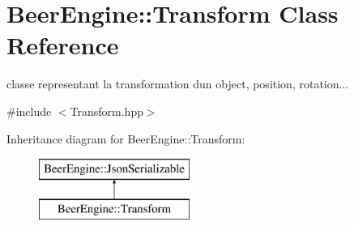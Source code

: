 \hypertarget{class_beer_engine_1_1_transform}{}\section{Beer\+Engine\+:\+:Transform Class Reference}
\label{class_beer_engine_1_1_transform}


classe representant la transformation d\textquotesingle{}un object, position, rotation...  




{\ttfamily \#include $<$Transform.\+hpp$>$}

Inheritance diagram for Beer\+Engine\+:\+:Transform\+:\begin{figure}[H]
\begin{center}
\leavevmode
\includegraphics[height=2.000000cm]{class_beer_engine_1_1_transform}
\end{center}
\end{figure}
